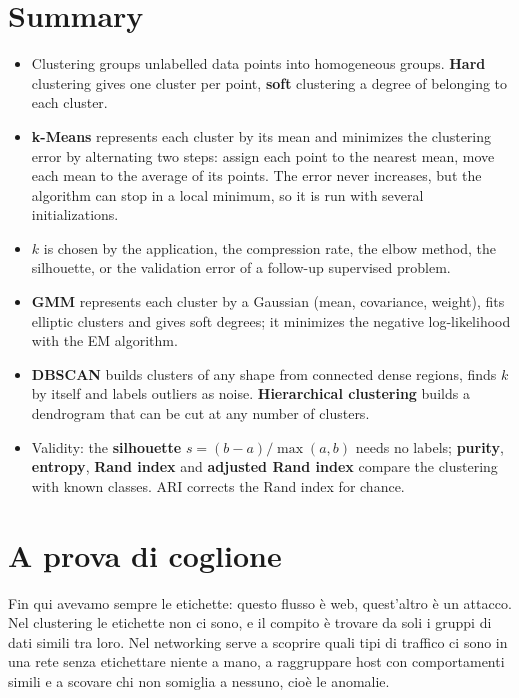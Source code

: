 \section{Summary}
\begin{itemize}
    \item Clustering groups unlabelled data points into homogeneous groups. \textbf{Hard} clustering gives one cluster per point, \textbf{soft} clustering a degree of belonging to each cluster.
    \item \textbf{k-Means} represents each cluster by its mean and minimizes the clustering error by alternating two steps: assign each point to the nearest mean, move each mean to the average of its points. The error never increases, but the algorithm can stop in a local minimum, so it is run with several initializations.
    \item $k$ is chosen by the application, the compression rate, the elbow method, the silhouette, or the validation error of a follow-up supervised problem.
    \item \textbf{GMM} represents each cluster by a Gaussian (mean, covariance, weight), fits elliptic clusters and gives soft degrees; it minimizes the negative log-likelihood with the EM algorithm.
    \item \textbf{DBSCAN} builds clusters of any shape from connected dense regions, finds $k$ by itself and labels outliers as noise. \textbf{Hierarchical clustering} builds a dendrogram that can be cut at any number of clusters.
    \item Validity: the \textbf{silhouette} $s = (b-a)/\max(a,b)$ needs no labels; \textbf{purity}, \textbf{entropy}, \textbf{Rand index} and \textbf{adjusted Rand index} compare the clustering with known classes. ARI corrects the Rand index for chance.
\end{itemize}



\section{A prova di coglione}
Fin qui avevamo sempre le etichette: questo flusso è web, quest'altro è un attacco. Nel clustering le etichette non ci sono, e il compito è trovare da soli i gruppi di dati simili tra loro. Nel networking serve a scoprire quali tipi di traffico ci sono in una rete senza etichettare niente a mano, a raggruppare host con comportamenti simili e a scovare chi non somiglia a nessuno, cioè le anomalie.

